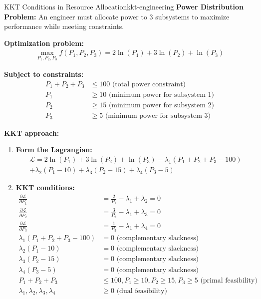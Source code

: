 \documentclass[12pt]{article}
\begin{document}
\begin{example}{KKT Conditions in Resource Allocation}{kkt-engineering}
\textbf{Power Distribution Problem:} An engineer must allocate power to 3 subsystems to maximize performance while meeting constraints.

\textbf{Optimization problem:}
\begin{align}


\max_{P_1, P_2, P_3} f(P_1, P_2, P_3) = 2\ln(P_1) + 3\ln(P_2) + \ln(P_3)
\end{align}

\textbf{Subject to constraints:}
\begin{align}
P_1 + P_2 + P_3 &\leq 100 \text{ (total power constraint)} \\
P_1 &\geq 10 \text{ (minimum power for subsystem 1)} \\
P_2 &\geq 15 \text{ (minimum power for subsystem 2)} \\
P_3 &\geq 5 \text{ (minimum power for subsystem 3)}
\end{align}

\textbf{KKT approach:}
\begin{enumerate}
    \item \textbf{Form the Lagrangian:}
    \begin{align}
    \mathcal{L} = 2\ln(P_1) + 3\ln(P_2) + \ln(P_3) - \lambda_1(P_1 + P_2 + P_3 - 100) \\
    + \lambda_2(P_1 - 10) + \lambda_3(P_2 - 15) + \lambda_4(P_3 - 5)
    \end{align}
    
    \item \textbf{KKT conditions:}
    \begin{align}
    \frac{\partial \mathcal{L}}{\partial P_1} &= \frac{2}{P_1} - \lambda_1 + \lambda_2 = 0 \\
    \frac{\partial \mathcal{L}}{\partial P_2} &= \frac{3}{P_2} - \lambda_1 + \lambda_3 = 0 \\
    \frac{\partial \mathcal{L}}{\partial P_3} &= \frac{1}{P_3} - \lambda_1 + \lambda_4 = 0 \\
    \lambda_1(P_1 + P_2 + P_3 - 100) &= 0 \text{ (complementary slackness)} \\
    \lambda_2(P_1 - 10) &= 0 \text{ (complementary slackness)} \\
    \lambda_3(P_2 - 15) &= 0 \text{ (complementary slackness)} \\
    \lambda_4(P_3 - 5) &= 0 \text{ (complementary slackness)} \\
    P_1 + P_2 + P_3 &\leq 100, P_1 \geq 10, P_2 \geq 15, P_3 \geq 5 \text{ (primal feasibility)} \\
    \lambda_1, \lambda_2, \lambda_3, \lambda_4 &\geq 0 \text{ (dual feasibility)}
    \end{align}
\end{enumerate}


\end{example}
\end{document}

